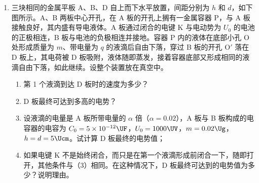 \documentclass[\gkver]{gaokaozhenti}
\begin{document}
\begin{enumerate}
{\onepicture[w=4cm, align=right]{}

（3）$mgr\cos\theta - mg\cdot\frac{r}{2}(1 + \sin\theta) = 0$　③

$2\cos\theta = 1 + \sin\theta$，

$4(1 - \sin^{2}\theta) = 1 + \sin^{2}\theta + 2\sin\theta$

$5\sin^{2}\theta + 2\sin\theta - 3 = 0$

$\sin\theta = \frac{-1 \pm \sqrt{1 + 15}}{5} = \frac{3}{5}$（舍去负根）

$\theta = 37^\circ$

\textbf{评分标准}：第（1）小题 3 分。第（2）小题 5 分，列出② 3 分，得出结果 2 分。第（3）小题 4 分，列出③ 2 分，得出 $\theta$ 结果 2 分。
}

\item
三块相同的金属平板 A、B、D 自上而下水平放置，间距分别为 $h$ 和 $d$，如下图所示。A、B 两板中心开孔，在 A 板的开孔上搁有一金属容器 P，与 A 板接触良好，其内盛有导电液体。A 板通过闭合的电键 K 与电动势为 $U_{0}$ 的电池的正极相连，B 板与电池的负极相连并接地。容器 P 内的液体在底部小孔 O 处形成质量为 $m$、带电量为 $q$ 的液滴后自由下落，穿过 B 板的开孔 O$'$ 落在 D 板上，其电荷被 D 板吸附，液体随即蒸发，接着容器底部又形成相同的液滴自由下落，如此继续。设整个装置放在真空中。
\begin{enumerate}
	\item
	第 1 个液滴到达 D 板时的速度为多少？
	\item
	D 板最终可达到多高的电势？
	\item
	设液滴的电量是 A 板所带电量的 $\alpha$ 倍（$\alpha = 0.02$），A 板与 B 板构成的电容器的电容为 $C_{0} = 5 \times 10^{-12}\UF$，$U_{0} = 1000\UV$，$m = 0.02\Ug$，$h = d = 5\Ucm$。试计算 D 板最终的电势值；
	\item
	如果电键 K 不是始终闭合，而只是在第一个液滴形成前闭合一下，随即打开，其他条件与（3）相同。在这种情况下，D 板最终可达到的电势值为多少？说明理由。
\end{enumerate}
\onepicture[w=6.5cm, align=right]{}
\end{enumerate}
\end{document}

